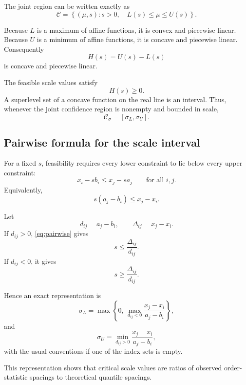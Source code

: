 \documentclass[11pt]{article}
\newcommand{\cC}{\mathcal{C}}
\begin{document}
The joint region can be written exactly as
\begin{equation}
    \cC
    =
    \left\{
        (\mu,s):
        s>0,\quad
        L(s)\leq\mu\leq U(s)
    \right\}.
    \label{eq:enveloperegion}
\end{equation}

Because $L$ is a maximum of affine functions, it is convex and
piecewise linear.  Because $U$ is a minimum of affine functions, it is
concave and piecewise linear.  Consequently
\[
    H(s)=U(s)-L(s)
\]
is concave and piecewise linear.

The feasible scale values satisfy
\[
    H(s)\geq0.
\]
A superlevel set of a concave function on the real line is an interval.
Thus, whenever the joint confidence region is nonempty and bounded in
scale,
\begin{equation}
    \cC_\sigma
    =
    [\sigma_L,\sigma_U].
\end{equation}


\subsection{Pairwise formula for the scale interval}

For a fixed $s$, feasibility requires every lower constraint to lie
below every upper constraint:
\[
    x_i-sb_i
    \leq
    x_j-sa_j
    \qquad
    \text{for all }i,j.
\]
Equivalently,
\begin{equation}
    s(a_j-b_i)
    \leq
    x_j-x_i.
    \label{eq:pairwise}
\end{equation}

Let
\[
    d_{ij}=a_j-b_i,
    \qquad
    \Delta_{ij}=x_j-x_i.
\]
If $d_{ij}>0$, \eqref{eq:pairwise} gives
\[
    s
    \leq
    \frac{\Delta_{ij}}{d_{ij}}.
\]
If $d_{ij}<0$, it gives
\[
    s
    \geq
    \frac{\Delta_{ij}}{d_{ij}}.
\]

Hence an exact representation is
\begin{equation}
    \sigma_L
    =
    \max
    \left\{
        0,\,
        \max_{d_{ij}<0}
        \frac{x_j-x_i}{a_j-b_i}
    \right\},
    \label{eq:sigmal}
\end{equation}
and
\begin{equation}
    \sigma_U
    =
    \min_{d_{ij}>0}
    \frac{x_j-x_i}{a_j-b_i},
    \label{eq:sigmau}
\end{equation}
with the usual conventions if one of the index sets is empty.

This representation shows that critical scale values are ratios of
observed order-statistic spacings to theoretical quantile spacings.
\end{document}
